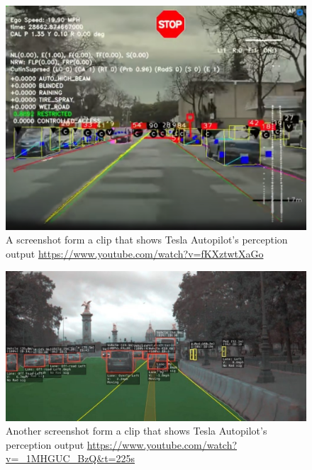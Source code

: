 \begin{figure}[!ht]
  \centering
  \includegraphics[width=150mm, keepaspectratio]{figures/teslaoutput.png}
  \caption{A screenshot form a clip that shows Tesla Autopilot's perception
  output \url{https://www.youtube.com/watch?v=fKXztwtXaGo}}
  \label{fig:teslaoutput}
\end{figure}

\begin{figure}[!ht]
  \centering
  \includegraphics[width=150mm, keepaspectratio]{figures/teslaoutput2.jpeg}
  \caption{Another screenshot form a clip that shows Tesla Autopilot's perception
  output \url{https://www.youtube.com/watch?v=_1MHGUC_BzQ&t=225s}}
  \label{fig:teslaoutput}
\end{figure}

